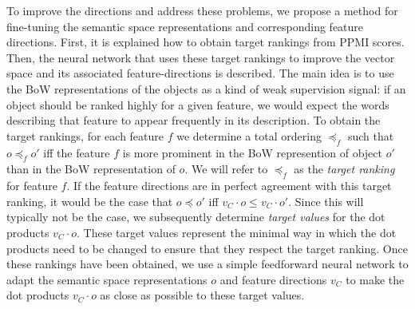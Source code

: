 



To improve the directions and address these problems, we propose a method for fine-tuning the semantic space representations and corresponding feature directions. First, it is explained how to obtain target rankings from PPMI scores. Then, the neural network that uses these target rankings to improve the vector space and its associated feature-directions is described. The main  idea is to use the BoW representations of the objects as a kind of weak supervision signal: if an object should be ranked highly for a given feature, we would expect the words describing that feature to appear frequently in its description.
To obtain the target rankings, for each feature $f$ we determine a total ordering $\preccurlyeq_f$ such that $o \preccurlyeq_f o'$ iff the feature $f$ is more prominent in the BoW represention of object $o'$ than in the BoW representation of $o$. We will refer to $\preccurlyeq_f$ as the \emph{target ranking} for feature $f$. If the feature directions are in perfect agreement with this target ranking, it would be the case that $o \preccurlyeq o'$ iff  $v_C \cdot o \leq v_C \cdot o'$. Since this will typically not be the case, we subsequently determine \emph{target values} for the dot products $v_C \cdot o$. These target values represent the minimal way in which the dot products need to be changed to ensure that they respect the target ranking.
Once these rankings have been obtained, we use a simple feedforward neural network to adapt the semantic space representations $o$ and feature directions $v_C$ to make the dot products $v_C \cdot o$ as close as possible to these target values. 

